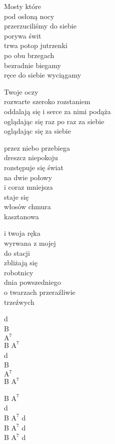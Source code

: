 \begin{text}
    Mosty które\\
    pod osłoną nocy\\
    przerzuciliśmy do siebie\\
    porywa świt\\
    trwa potop jutrzenki\\
    po obu brzegach\\
    bezradnie biegamy\\
    ręce do siebie wyciągamy

    Twoje oczy\\
    rozwarte szeroko rozstaniem\\
    oddalają się i serce za nimi podąża\\
    oglądając się raz po raz za siebie\\
    oglądając się za siebie

    przez niebo przebiega\\
    dreszcz niepokoju\\
    rozstępuje się świat\\
    na dwie połowy\\
    i coraz mniejsza\\
    staje się\\
    włosów chmura\\
    kasztanowa

    i twoja ręka\\
    wyrwana z mojej\\
    do stacji\\
    zbliżają się\\
    robotnicy\\
    dnia powszedniego\\
    o twarzach przeraźliwie\\
    trzeźwych
\end{text}
\begin{chord}
    d\\
    B\\
    $\mathrm{A^{7}}$\\
    B $\mathrm{A^{7}}$\\
    d\\
    B\\
    $\mathrm{A^{7}}$\\
    B $\mathrm{A^{7}}$

    B $\mathrm{A^{7}}$\\
    d\\
    B $\mathrm{A^{7}}$ d\\
    B $\mathrm{A^{7}}$ d\\
    B $\mathrm{A^{7}}$ d
\end{chord}

